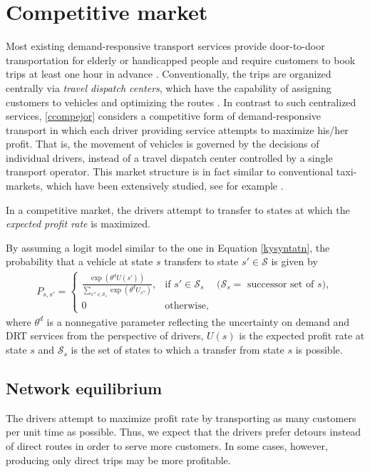 \documentclass[dissertation,draft*]{aaltoseries}
\begin{document}
\section{Competitive market}
\label{compdescription}
Most existing demand-responsive transport services provide door-to-door transportation for elderly or handicapped people
and require customers to book trips at least one hour in advance \citep{cordeau05,jouko}.
Conventionally, the trips are organized centrally via \emph{travel dispatch centers}, which have the capability of
assigning customers to vehicles and optimizing the routes \citep{mageean}.
In contrast to such centralized services, \ref{ccompejor} considers a competitive form of demand-responsive transport in which 
each driver providing service attempts to maximize his/her profit. That is,
the movement of vehicles is governed by the decisions of individual drivers, 
instead of a travel dispatch center controlled by a single transport operator.
This market structure is in fact similar to conventional taxi-markets, which have been extensively studied, see for example 
\citep{hackner1995,arnott1996,cairns1996,flores-guri2003,lagos2003,wong2005,matsushima2006,fernandez2006,moore2006,yang2002,yang2005,yang2010}.

In a competitive market, the drivers attempt to transfer to
states at which the \emph{expected profit rate} is maximized. 

By assuming a logit model similar to the one in Equation \eqref{kysyntatn},
the probability that a vehicle at state $s$ transfers to state $s' \in \mathcal{S}$
is given by
\begin{align}
\label{transitionprobability}
P_{s,s'} = 
\left\{
\begin{array}{llr}
\frac{\exp(\theta^d U(s'))}{\sum_{s'' \in \mathcal{S}_{s}} \exp(\theta^d U_{s''})}, 
& \mbox{if } s' \in \mathcal{S}_s & (\mathcal{S}_s = \mbox{ successor set of $s$)}, \\
0 & \mbox{otherwise},&
\end{array}
\right.
\end{align}
where $\theta^d$ is a 
nonnegative parameter reflecting the uncertainty on
demand and DRT services from the perspective of drivers, $U(s)$ is the expected profit rate at state $s$ and 
$\mathcal{S}_s$ is the set of states to which a transfer from state $s$ is possible. 


\subsection{Network equilibrium}
\label{networkequilibrium}
The drivers attempt to maximize profit rate by 
transporting as many customers per unit time as possible. Thus, we expect that the
drivers prefer detours instead of direct routes in order to serve more 
customers.
In some cases, however, producing only direct trips may be more profitable. 
\end{document}
